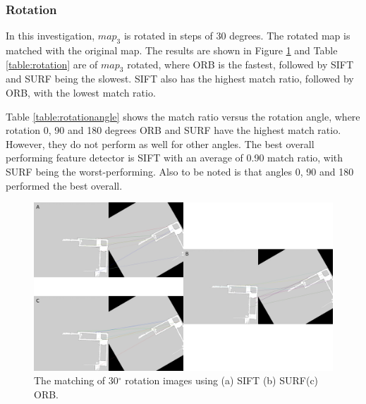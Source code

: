 \subsubsection{Rotation}

In this investigation, $map_3$ is rotated in steps of 30 degrees. The rotated map is matched with the original map. The results are shown in Figure \ref{fig:rotation} and Table \ref{table:rotation} are of $map_3$ rotated, where ORB is the fastest, followed by SIFT and SURF being the slowest. SIFT also has the highest match ratio, followed by ORB, with the lowest match ratio.

Table \ref{table:rotationangle} shows the match ratio versus the rotation angle, where rotation 0, 90 and 180 degrees ORB and SURF have the highest match ratio. However, they do not perform as well for other angles. The best overall performing feature detector is SIFT with an average of 0.90 match ratio, with SURF being the worst-performing. Also to be noted is that angles 0, 90 and 180 performed the best overall.

\begin{figure}[H]
    \centering
    \includegraphics[width=1\textwidth]{figs/matching_of_30_rotation.png}
    \caption{ The matching of 30$^\circ$ rotation images using (a) SIFT (b) SURF(c) ORB.}
    \label{fig:rotation}
\end{figure}

